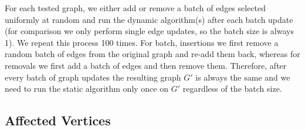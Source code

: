 For each tested graph, we either add or remove a batch of edges selected
uniformly at random and run the dynamic algorithm(s) after each batch update
(for \dynmwmrandom comparison we only perform single edge updates, so
the batch size is always 1). We repeat this process 100 times. For batch,
insertions we first remove a random batch of edges from the original graph and
re-add them back, whereas for removals we first add a batch of edges and then
remove them. Therefore, after every batch of graph updates the resulting graph
$G'$ is always the same and we need to run the static \suitor algorithm only
once on $G'$ regardless of the batch size.

\subsection{Affected Vertices}
\label{sec:dyn-mwm:affected-vertices}
%

